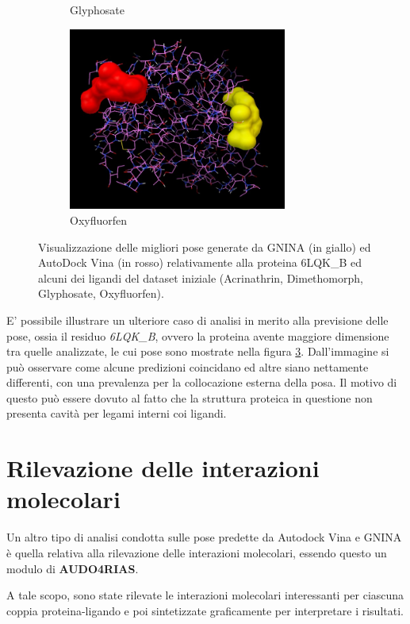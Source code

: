 \begin{figure}[H]
\begin{subfigure}[b]{0.475\textwidth}
        \caption[]%
        {{\small Glyphosate}}    
        \label{fig:6lqk_b_glyphosate}
    \end{subfigure}
    \hfill
    \begin{subfigure}[b]{0.475\textwidth}   
        \centering 
        \includegraphics[width=\textwidth, height=6cm]{immagini/capitolo4/6lqk_b_oxyfluorfen.jpg}
        \caption[]%
        {{\small Oxyfluorfen}}    
        \label{fig:6lqk_b_oxyfluorfen}
        \end{subfigure}
    \caption[Conformazioni proteina-ligando per la proteina 6LQK\_B]
    {\small Visualizzazione delle migliori pose generate da GNINA (in giallo) ed AutoDock Vina (in rosso) relativamente alla proteina 6LQK\_B ed alcuni dei ligandi del dataset iniziale (Acrinathrin, Dimethomorph, Glyphosate, Oxyfluorfen).} 
    \label{fig:6lqk_b}
\end{figure}

E' possibile illustrare un ulteriore caso di analisi in merito alla previsione delle pose, ossia il residuo \textit{6LQK\_B}, ovvero la proteina avente maggiore dimensione tra quelle analizzate, le cui pose sono mostrate nella figura \ref{fig:6lqk_b}. Dall'immagine si può osservare come alcune predizioni coincidano ed altre siano nettamente differenti, con una prevalenza per la collocazione esterna della posa. Il motivo di questo può essere dovuto al fatto che la struttura proteica in questione non presenta cavità per legami interni coi ligandi.

\section{Rilevazione delle interazioni molecolari}
Un altro tipo di analisi condotta sulle pose predette da Autodock Vina e GNINA è quella relativa alla rilevazione delle interazioni molecolari, essendo questo un modulo di \textbf{AUDO4RIAS}.

A tale scopo, sono state rilevate le interazioni molecolari interessanti per ciascuna coppia proteina-ligando e poi sintetizzate graficamente per interpretare i risultati.


